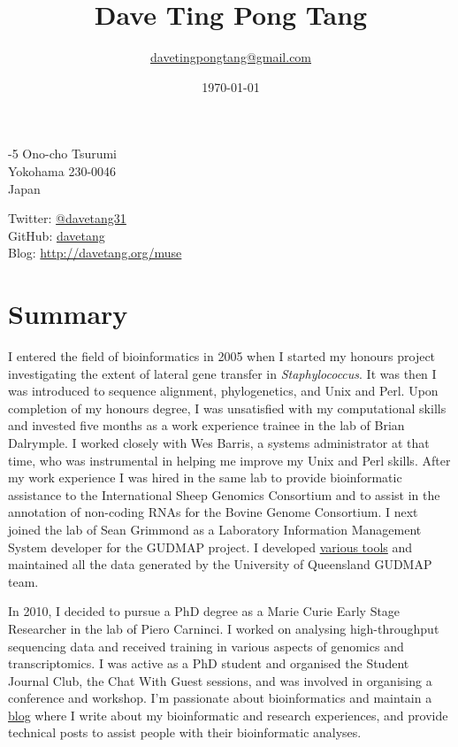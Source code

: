 \documentclass[a4paper, 10pt]{article}
\title{\bfseries\Huge Dave Ting Pong Tang}
\author{
   \href{mailto:davetingpongtang@gmail.com}{davetingpongtang@gmail.com}
}
\date{\mydate\today}
\begin{document}
\maketitle

\begin{minipage}[ht]{.40\textwidth}-5 Ono-cho Tsurumi \\
Yokohama 230-0046 \\
Japan
\end{minipage}
\begin{minipage}[ht]{.50\textwidth}\centering
Twitter: \href{https://twitter.com/davetang31}{@davetang31} \\
GitHub: \href{https://github.com/davetang}{davetang} \\
Blog: \href{http://davetang.org/muse}{http://davetang.org/muse}
\end{minipage}

\section*{Summary}

I entered the field of bioinformatics in 2005 when I started my honours project investigating the extent of lateral gene transfer in \textit{Staphylococcus}. It was then I was introduced to sequence alignment, phylogenetics, and Unix and Perl. Upon completion of my honours degree, I was unsatisfied with my computational skills and invested five months as a work experience trainee in the lab of Brian Dalrymple. I worked closely with Wes Barris, a systems administrator at that time, who was instrumental in helping me improve my Unix and Perl skills. After my work experience I was hired in the same lab to provide bioinformatic assistance to the International Sheep Genomics Consortium and to assist in the annotation of non-coding RNAs for the Bovine Genome Consortium. I next joined the lab of Sean Grimmond as a Laboratory Information Management System developer for the GUDMAP project. I developed \href{http://uqgudmap.imb.uq.edu.au/tools.html}{various tools} and maintained all the data generated by the University of Queensland GUDMAP team.

In 2010, I decided to pursue a PhD degree as a Marie Curie Early Stage Researcher in the lab of Piero Carninci. I worked on analysing high-throughput sequencing data and received training in various aspects of genomics and transcriptomics. I was active as a PhD student and organised the Student Journal Club, the Chat With Guest sessions, and was involved in organising a conference and workshop. I'm passionate about bioinformatics and maintain a \href{http://davetang.org/muse}{blog} where I write about my bioinformatic and research experiences, and provide technical posts to assist people with their bioinformatic analyses.
\end{document}

